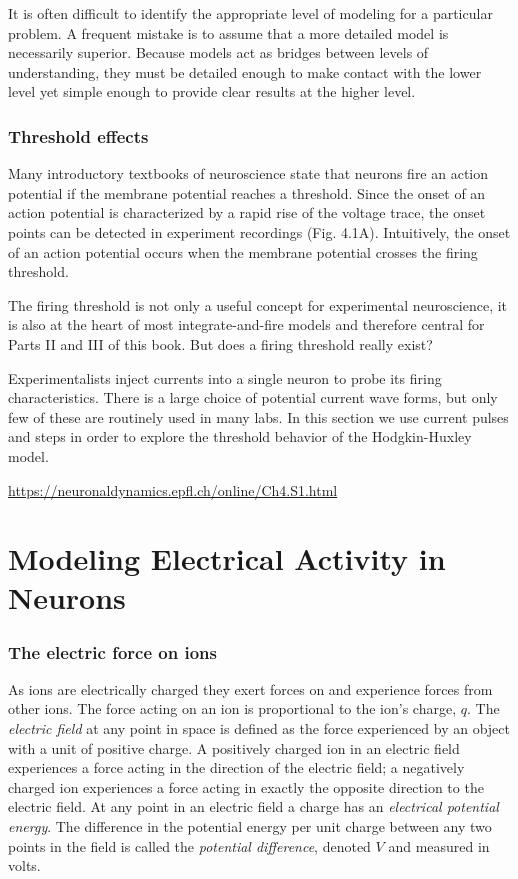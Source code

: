 It is often difficult to identify the appropriate level of modeling for a particular problem. A frequent mistake is to assume that a more detailed model is necessarily superior. Because models act as bridges between levels of understanding, they must be detailed enough to make contact with the lower level yet simple enough to provide clear results at the higher level.


\subsubsection{Threshold effects}
Many introductory textbooks of neuroscience state that neurons fire an action potential if the membrane potential reaches a threshold. Since the onset of an action potential is characterized by a rapid rise of the voltage trace, the onset points can be detected in experiment recordings (Fig. 4.1A). Intuitively, the onset of an action potential occurs when the membrane potential crosses the firing threshold.

The firing threshold is not only a useful concept for experimental neuroscience, it is also at the heart of most integrate-and-fire models and therefore central for Parts II and III of this book. But does a firing threshold really exist?

Experimentalists inject currents into a single neuron to probe its firing characteristics. There is a large choice of potential current wave forms, but only few of these are routinely used in many labs. In this section we use current pulses and steps in order to explore the threshold behavior of the Hodgkin-Huxley model.

\url{https://neuronaldynamics.epfl.ch/online/Ch4.S1.html}

\section{Modeling Electrical Activity in Neurons}

\subsubsection{The electric force on ions}

As ions are electrically charged they exert forces on and experience forces from other ions. The force acting on an ion is proportional to the ion’s charge, $q$. The \textit{electric field} at any point in space is defined as the force experienced by an object with a unit of positive charge. A positively charged ion in an electric field experiences a force acting in the direction of the electric field; a negatively charged ion experiences a force acting in exactly the opposite direction to the electric field. At any point in an electric field a charge has an \textit{electrical potential energy}. The difference in the potential energy per unit charge between any two points in the field is called the \textit{potential difference}, denoted $V$ and measured in volts.

